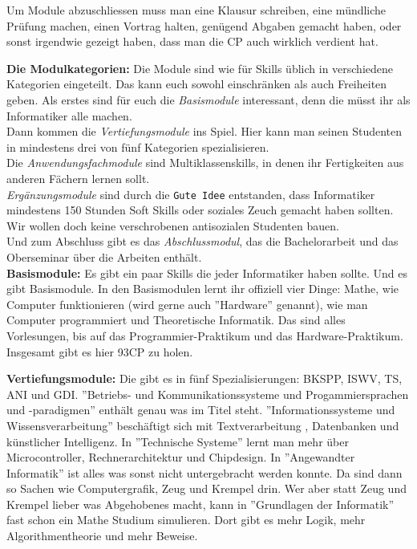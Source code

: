 Um Module abzuschliessen muss man eine Klausur schreiben, eine m\"undliche
Pr\"ufung machen, einen Vortrag halten, gen\"ugend Abgaben gemacht haben, oder
sonst irgendwie gezeigt haben, dass man die CP auch wirklich verdient hat.


\textbf{Die Modulkategorien:}
Die Module sind wie f\"ur Skills \"ublich in verschiedene Kategorien
eingeteilt. Das kann euch sowohl einschr\"anken als auch Freiheiten geben.
Als erstes sind f\"ur euch die \emph{Basismodule} interessant, denn die m\"usst ihr als Informatiker alle machen.\\
Dann kommen die \emph{Vertiefungsmodule} ins Spiel. Hier kann man seinen Studenten in mindestens drei von f\"unf Kategorien spezialisieren.\\
Die \emph{Anwendungsfachmodule} sind Multiklassenskills, in denen ihr Fertigkeiten aus anderen F\"achern lernen sollt.\\
\emph{Erg\"anzungsmodule} sind durch die \texttt{Gute Idee\texttrademark} entstanden, dass Informatiker mindestens 150 Stunden Soft Skills oder soziales Zeuch gemacht haben sollten. Wir wollen doch keine verschrobenen antisozialen Studenten bauen.\\
Und zum Abschluss gibt es das \emph{Abschlussmodul}, das die Bachelorarbeit und das Oberseminar \"uber die Arbeiten enth\"alt.\\

\textbf{Basismodule:}
Es gibt ein paar Skills die jeder Informatiker haben sollte. Und es gibt
Basismodule. In den Basismodulen lernt ihr offiziell vier Dinge: Mathe, wie
Computer funktionieren (wird gerne auch ''Hardware'' genannt), wie man Computer
programmiert und Theoretische Informatik. Das sind alles Vorlesungen, bis auf
das Programmier-Praktikum und das Hardware-Praktikum.
Insgesamt gibt es hier 93CP zu holen.

\textbf{Vertiefungsmodule:}
Die gibt es in f\"unf Spezialisierungen: BKSPP, ISWV, TS, ANI und GDI. ''Betriebs-
und Kommunikationssysteme und Progammiersprachen und -paradigmen'' enth\"alt
genau was im Titel steht. ''Informationssysteme und Wissensverarbeitung''
besch\"aftigt sich mit Textverarbeitung , Datenbanken und k\"unstlicher
Intelligenz. In ''Technische Systeme'' lernt man mehr \"uber Microcontroller,
Rechnerarchitektur und Chipdesign. In ''Angewandter Informatik'' ist alles was
sonst nicht untergebracht werden konnte. Da sind dann so Sachen wie
Computergrafik, Zeug und Krempel drin. Wer aber statt Zeug und Krempel lieber
was Abgehobenes macht, kann in ''Grundlagen der Informatik'' fast schon ein
Mathe Studium simulieren. Dort gibt es mehr Logik, mehr Algorithmentheorie und mehr
Beweise.

